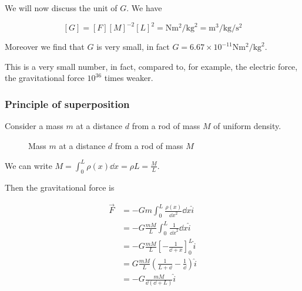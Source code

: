 \documentclass[10pt]{extarticle}
\begin{document}
We will now discuss the unit of $G$.
We have

$$
    [G] = [F][M]^{-2}[L]^2 = \si{\newton \meter \squared \per \kilogram \squared} = \si{\meter \cubed \per \kilogram \per \second \squared}
$$

Moreover we find that $G$ is very small, in fact $G = 6.67 \times 10^{-11} \si{\newton \meter \squared \per \kilogram \squared}$.

This is a very small number, in fact, compared to, for example, the electric force, the gravitational force $10^{36}$ times weaker.

\subsubsection{Principle of superposition}

Consider a mass $m$ at a distance $d$ from a rod of mass $M$ of uniform density.

\begin{figure}[H]
    \centering

    \caption{Mass $m$ at a distance $d$ from a rod of mass $M$}
    \label{fig:mass_rod}
\end{figure}

We can write $M = \int_0^L \rho(x) \dd{x} = \rho L = \frac{M}{L}$.

Then the gravitational force is

\begin{align*}
    \vec F & = - G m \int_0^L \frac{\rho(x)}{{\dd{} x}^2}  \dd{x} \hat i                   \\
           & = - G \frac{m M}{L} \int_0^L \frac{1}{{\dd{} x}^2}  \dd{x} \hat i             \\
           & = - G \frac{m M}{L} \left[ - \frac{1}{\dd{} + x} \right]_0^L \hat i           \\
           & = G \frac{m M}{L} \left( \frac{1}{L + \dd{}} - \frac{1}{\dd{}} \right) \hat i \\
           & = -G \frac{m M}{\dd{} (\dd{} + L)} \hat i
\end{align*}
\end{document}
